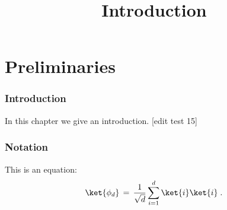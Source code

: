 

%
\usepackage{marginnote}


\title{Introduction}
\hypertarget{0000}{}
\reversemarginpar{}
\label{introduction}


\maketitle


\tableofcontents

\part{Preliminaries}
\hypertarget{0001}{}
\reversemarginpar{}
\label{book-part-preliminaries}

\section{Introduction}

In this chapter we give an introduction. [edit test 15]

\section{Notation}

This is an equation:
\begin{equation}
\label{eq:me-state}
 \ket{\phi_d} \,=\,\frac{1}{\sqrt{d}} \sum_{i=1}^d \ket{i}\ket{i}\;.
\end{equation}








